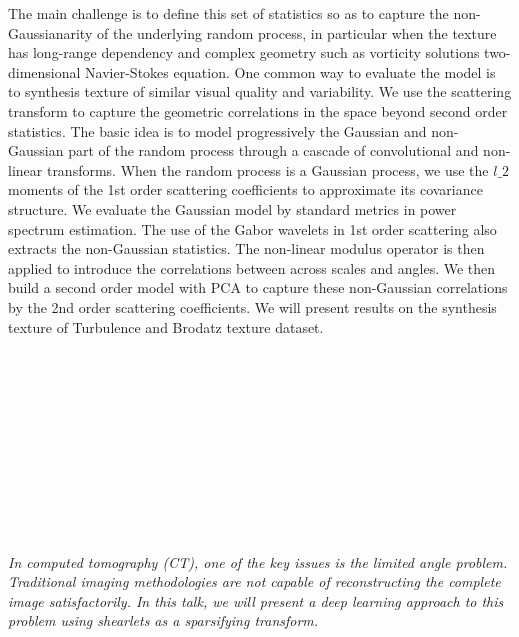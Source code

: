 \begin{multicols}{2}
{The main challenge is to define this set of statistics so as to capture the non-Gaussianarity of the underlying random process, in particular when the texture has long-range dependency and complex geometry such as vorticity solutions two-dimensional Navier-Stokes equation. One common way to evaluate the model is to synthesis texture of similar visual quality and variability.
We use the scattering transform to capture the geometric correlations in the space beyond second order statistics. 
The basic idea is to model progressively the Gaussian and non-Gaussian part of the random process through a cascade of convolutional and non-linear transforms. When the random process is a Gaussian process, we use the $l\_2$ moments of the 1st order scattering coefficients to approximate its covariance structure. We evaluate the Gaussian model by standard metrics in power spectrum estimation. 
The use of the Gabor wavelets in 1st order scattering also extracts the non-Gaussian statistics. The non-linear modulus operator is then applied to introduce the correlations between across scales and angles. We then build a second order model with PCA to capture these non-Gaussian correlations by the 2nd order scattering coefficients. We will present results on the synthesis texture of Turbulence and Brodatz texture dataset. }\\
\\ 
        \\
        \\\\
\\
      \textit{}\\
\\ 
        \\
        \\\\
\\
      \textit{In computed tomography (CT), one of the key issues is the limited angle problem. Traditional imaging methodologies are not capable of reconstructing the complete image satisfactorily. In this talk, we will present a deep learning approach to this problem using shearlets as a sparsifying transform.}\\
\\ 
        \\
        \\\\
        \\

\end{multicols}
